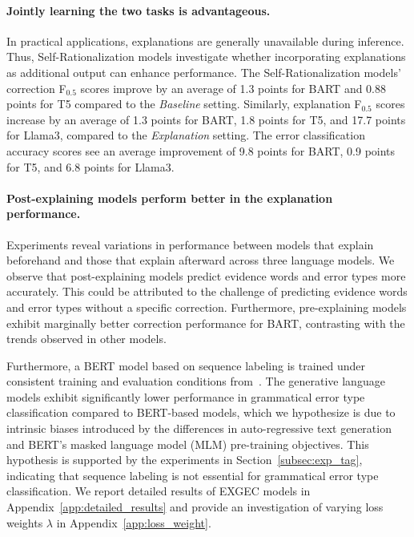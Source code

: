 \paragraph{Jointly learning the two tasks is advantageous.}
In practical applications, explanations are generally unavailable during inference. Thus, Self-Rationalization models investigate whether incorporating explanations as additional output can enhance performance. The Self-Rationalization models' correction F$_{0.5}$ scores improve by an average of 1.3 points for BART and 0.88 points for T5 compared to the \textit{Baseline} setting. Similarly, explanation F$_{0.5}$ scores increase by an average of 1.3 points for BART, 1.8 points for T5, and 17.7 points for Llama3, compared to the \textit{Explanation} setting. The error classification accuracy scores see an average improvement of 9.8 points for BART, 0.9 points for T5, and 6.8 points for Llama3.

\paragraph{Post-explaining models perform better in the explanation performance.} Experiments reveal variations in performance between models that explain beforehand and those that explain afterward across three language models. We observe that post-explaining models predict evidence words and error types more accurately. This could be attributed to the challenge of predicting evidence words and error types without a specific correction. Furthermore, pre-explaining models exhibit marginally better correction performance for BART, contrasting with the trends observed in other models.



Furthermore, a BERT model based on sequence labeling is trained under consistent training and evaluation conditions from~\citet{fei-etal-2023-enhancing}. The generative language models exhibit significantly lower performance in grammatical error type classification compared to BERT-based models, which we hypothesize is due to intrinsic biases introduced by the differences in auto-regressive text generation and BERT's masked language model (MLM) pre-training objectives. This hypothesis is supported by the experiments in Section~\ref{subsec:exp_tag}, indicating that sequence labeling is not essential for grammatical error type classification. We report detailed results of EXGEC models in Appendix~\ref{app:detailed_results} and provide an investigation of varying loss weights $\lambda$ in Appendix~\ref{app:loss_weight}.


